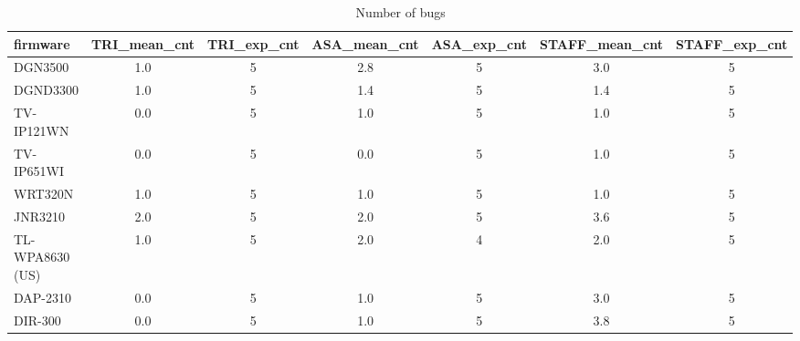 \begin{table}[ht]
\centering
\renewcommand{\arraystretch}{1.06}
\setlength{\tabcolsep}{4pt}
\begin{tabular}{|l||c|c|c|c|c|c|}
\hline
{\sc firmware} & {\sc TRI\_mean\_cnt} & {\sc TRI\_exp\_cnt} & {\sc ASA\_mean\_cnt} & {\sc ASA\_exp\_cnt} & {\sc STAFF\_mean\_cnt} & {\sc STAFF\_exp\_cnt} \\
\toprule
\hline
DGN3500 & 1.0 & 5 & 2.8 & 5 & 3.0 & 5 \\
\hline
DGND3300 & 1.0 & 5 & 1.4 & 5 & 1.4 & 5 \\
\hline
TV-IP121WN & 0.0 & 5 & 1.0 & 5 & 1.0 & 5 \\
\hline
TV-IP651WI & 0.0 & 5 & 0.0 & 5 & 1.0 & 5 \\
\hline
WRT320N & 1.0 & 5 & 1.0 & 5 & 1.0 & 5 \\
\hline
JNR3210 & 2.0 & 5 & 2.0 & 5 & 3.6 & 5 \\
\hline
TL-WPA8630 (US) & 1.0 & 5 & 2.0 & 4 & 2.0 & 5 \\
\hline
DAP-2310 & 0.0 & 5 & 1.0 & 5 & 3.0 & 5 \\
\hline
DIR-300 & 0.0 & 5 & 1.0 & 5 & 3.8 & 5 \\
\hline
\end{tabular}
\caption{Number of bugs}
\end{table}
